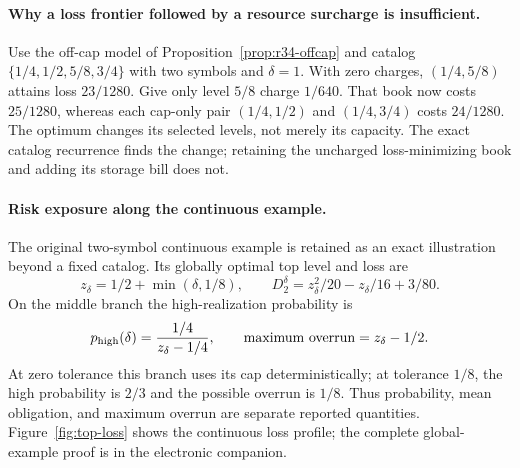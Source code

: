 \paragraph{Why a loss frontier followed by a resource surcharge is insufficient.}
Use the off-cap model of Proposition~\ref{prop:r34-offcap} and catalog $\{1/4,1/2,5/8,3/4\}$ with two symbols and $\delta=1$. With zero charges, $(1/4,5/8)$ attains loss $23/1280$. Give only level $5/8$ charge $1/640$. That book now costs $25/1280$, whereas each cap-only pair $(1/4,1/2)$ and $(1/4,3/4)$ costs $24/1280$. The optimum changes its selected levels, not merely its capacity. The exact catalog recurrence finds the change; retaining the uncharged loss-minimizing book and adding its storage bill does not.

\paragraph{Risk exposure along the continuous example.}
The original two-symbol continuous example is retained as an exact illustration beyond a fixed catalog. Its globally optimal top level and loss are
\begin{equation}\label{eq:r37-risk-frontier}
 z_\delta=1/2+\min(\delta,1/8),\qquad D_2^\delta=z_\delta^2/20-z_\delta/16+3/80.
\end{equation} On the middle branch the high-realization probability is
\[
 p_{\rm high}(\delta)=\frac{1/4}{z_\delta-1/4},\qquad
 \text{maximum overrun}=z_\delta-1/2.
\]
At zero tolerance this branch uses its cap deterministically; at tolerance $1/8$, the high probability is $2/3$ and the possible overrun is $1/8$. Thus probability, mean obligation, and maximum overrun are separate reported quantities. Figure~\ref{fig:top-loss} shows the continuous loss profile; the complete global-example proof is in the electronic companion.
